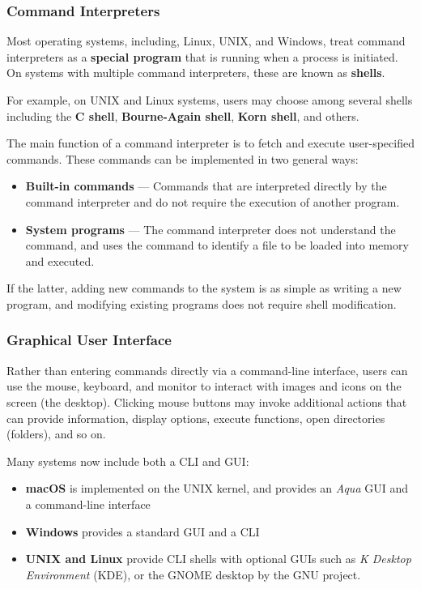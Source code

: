\documentclass{article}
\begin{document}
\subsubsection{Command Interpreters}
Most operating systems, including, Linux, UNIX, and Windows, treat
command interpreters as a \textbf{special program} that is running when
a process is initiated. On systems with multiple command interpreters,
these are known as \textbf{shells}.

For example, on UNIX and Linux systems, users may choose among several
shells including the \textbf{C shell}, \textbf{Bourne-Again shell},
\textbf{Korn shell}, and others.

The main function of a command interpreter is to fetch and execute
user-specified commands. These commands can be implemented in two
general ways:
\begin{itemize}
    \item \textbf{Built-in commands} --- Commands that are interpreted
          directly by the command interpreter and do not require the
          execution of another program.
    \item \textbf{System programs} --- The command interpreter does not
          understand the command, and uses the command to identify a file
          to be loaded into memory and executed.
\end{itemize}
If the latter, adding new commands to the system is as simple as
writing a new program, and modifying existing programs does not
require shell modification.
\subsubsection{Graphical User Interface}
Rather than entering commands directly via a command-line interface,
users can use the mouse, keyboard, and monitor to interact with images
and icons on the screen (the desktop). Clicking mouse buttons may
invoke additional actions that can provide information, display
options, execute functions, open directories (folders), and so on.

Many systems now include both a CLI and GUI:
\begin{itemize}
    \item \textbf{macOS} is implemented on the UNIX kernel, and provides
          an \textit{Aqua} GUI and a command-line interface
    \item \textbf{Windows} provides a standard GUI and a CLI
    \item \textbf{UNIX and Linux} provide CLI shells with optional GUIs
          such as \textit{K Desktop Environment} (KDE), or the GNOME
          desktop by the GNU project.
\end{itemize}
\end{document}
